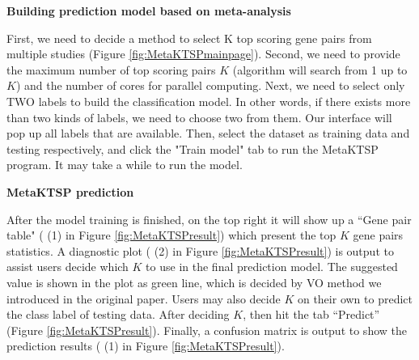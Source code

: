 \begin{steps}
\item \textbf{Building prediction model based on meta-analysis}

First, we need to decide a method to select K top scoring gene pairs from multiple studies (Figure \ref{fig:MetaKTSPmainpage}). 
Second, we need to provide the maximum number of top scoring pairs $K$ (algorithm will search from 1 up to $K$) and the number of cores for parallel computing. 
Next, we need to select only TWO labels to build the classification model. 
In other words, if there exists more than two kinds of labels, we need to choose two from them. 
Our interface will pop up all labels that are available. 
Then, select the dataset as training data and testing respectively, 
and click the "Train model" tab to run the MetaKTSP program. 
It may take a while to run the model.

\item \textbf{MetaKTSP prediction}

After the model training is finished, on the top right it will show up a ``Gene pair table" ({\color{red} (1)} in Figure \ref{fig:MetaKTSPresult}) which present the top $K$ gene pairs statistics. 
A diagnostic plot ({\color{red} (2)} in Figure \ref{fig:MetaKTSPresult}) is output to assist users decide which $K$ to use in the final prediction model. 
The suggested value is shown in the plot as green line, which is decided by VO method we introduced in the original paper. Users may also decide $K$ on their own to predict the class label of testing data. 
After deciding $K$, then hit the tab ``Predict'' (Figure \ref{fig:MetaKTSPresult}). 
Finally, a confusion matrix is output to show the prediction results ({\color{red} (1)} in Figure \ref{fig:MetaKTSPresult}).


\end{steps}
